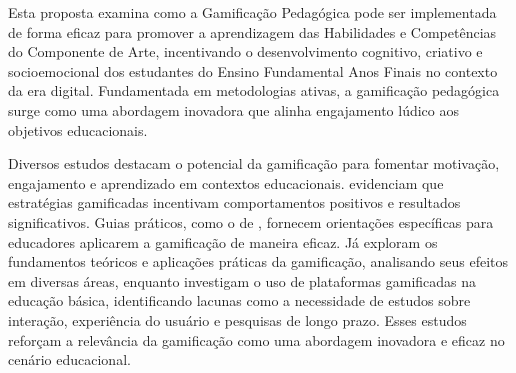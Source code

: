 Esta proposta examina como a Gamificação Pedagógica pode ser implementada de forma eficaz para promover a aprendizagem das Habilidades e Competências do Componente de Arte, incentivando o desenvolvimento cognitivo, criativo e socioemocional dos estudantes do Ensino Fundamental Anos Finais no contexto da era digital. Fundamentada em metodologias ativas, a gamificação pedagógica surge como uma abordagem inovadora que alinha engajamento lúdico aos objetivos educacionais. 

Diversos estudos destacam o potencial da gamificação para fomentar motivação, engajamento e aprendizado em contextos educacionais. \textcite{hamari2014does} evidenciam que estratégias gamificadas incentivam comportamentos positivos e resultados significativos. Guias práticos, como o de \textcite{detecnicas}, fornecem orientações específicas para educadores aplicarem a gamificação de maneira eficaz. Já \textcite{seaborn2015gamification} exploram os fundamentos teóricos e aplicações práticas da gamificação, analisando seus efeitos em diversas áreas, enquanto \textcite{de2022game} investigam o uso de plataformas gamificadas na educação básica, identificando lacunas como a necessidade de estudos sobre interação, experiência do usuário e pesquisas de longo prazo. Esses estudos reforçam a relevância da gamificação como uma abordagem inovadora e eficaz no cenário educacional. 



